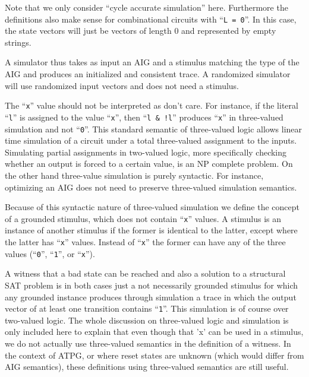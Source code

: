 \documentclass[10pt]{llncs}
\begin{document}
  Note that we only consider ``cycle accurate simulation'' here.  Furthermore
  the definitions also make sense for combinational circuits with ``\texttt{L =
  0}''.
  In this case, the state vectors will just be vectors of length 0 and
  represented by empty strings.

  A simulator thus takes as input an AIG and a stimulus matching the type
  of the AIG and produces an initialized and consistent trace.  A randomized
  simulator will use randomized input vectors and does not need a stimulus.

  The ``\texttt{x}'' value should not be interpreted as don't care.  For instance, if
  the literal ``\texttt{l}'' is assigned to the value ``\texttt{x}'', then
  ``\texttt{l \& !l}'' produces ``\texttt{x}''
  in three-valued simulation and not ``\texttt{0}''.  This standard semantic of
  three-valued logic allows linear time simulation of a circuit under a
  total three-valued assignment to the inputs.  Simulating partial
  assignments in two-valued logic, more specifically checking whether an
  output is forced to a certain value, is an NP complete problem.  On the
  other hand three-value simulation is purely syntactic.  For instance,
  optimizing an AIG does not need to preserve three-valued simulation
  semantics.

  Because of this syntactic nature of three-valued simulation we define the
  concept of a grounded stimulus, which does not contain ``\texttt{x}'' values.
  A stimulus is an instance of another stimulus if the former is identical
  to the latter, except where the latter has ``\texttt{x}'' values.  Instead of
  ``\texttt{x}'' the
  former can have any of the three values (``\texttt{0}'', ``\texttt{1}'', or ``\texttt{x}'').

  A witness that a bad state can be reached and also a solution to a
  structural SAT problem is in both cases just a not necessarily grounded
  stimulus for which any grounded instance produces through simulation a
  trace in which the output vector of at least one transition contains
  ``\texttt{1}''.
  This simulation is of course over two-valued logic.  The whole discussion
  on three-valued logic and simulation is only included here to explain that
  even though that 'x' can be used in a stimulus, we do not actually use
  three-valued semantics in the definition of a witness.  In the context
  of ATPG, or where reset states are unknown (which would differ from AIG
  semantics), these definitions using three-valued semantics are still
  useful.
\end{document}
